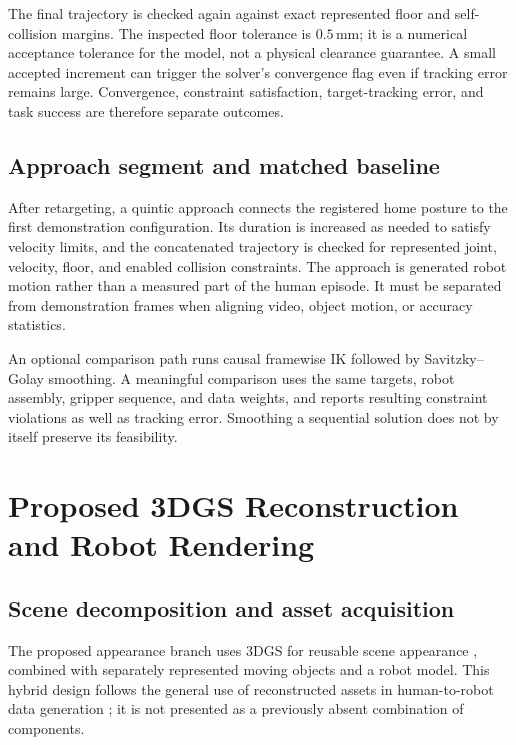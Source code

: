The final trajectory is checked again against exact represented floor
and self-collision margins. The inspected floor tolerance is
$0.5$\,mm; it is a numerical acceptance tolerance for the model, not a
physical clearance guarantee. A small accepted increment can trigger the
solver's convergence flag even if tracking error remains large. Convergence,
constraint satisfaction, target-tracking error, and task success are
therefore separate outcomes.

\subsection{Approach segment and matched baseline}

After retargeting, a quintic approach connects the registered home posture
to the first demonstration configuration. Its duration is increased as
needed to satisfy velocity limits, and the concatenated trajectory is
checked for represented joint, velocity, floor, and enabled collision
constraints. The approach is generated robot motion rather than a measured
part of the human episode. It must be separated from demonstration frames
when aligning video, object motion, or accuracy statistics.

An optional comparison path runs causal framewise IK followed by
Savitzky--Golay smoothing. A meaningful comparison uses the same targets,
robot assembly, gripper sequence, and data weights, and reports resulting
constraint violations as well as tracking error. Smoothing a sequential
solution does not by itself preserve its feasibility.

\section{Proposed 3DGS Reconstruction and Robot Rendering}
\label{sec:gs-method}

\subsection{Scene decomposition and asset acquisition}

The proposed appearance branch uses 3DGS for reusable scene appearance
\cite{gaussiansplatting}, combined with separately represented moving
objects and a robot model. This hybrid design follows the general use of
reconstructed assets in human-to-robot data generation
\cite{real2render2real,robopaint}; it is not presented as a previously absent
combination of components.

